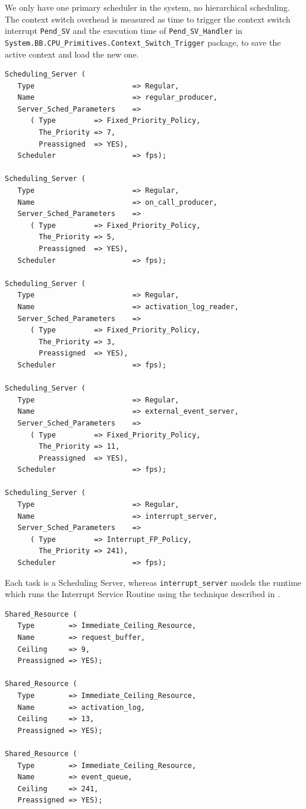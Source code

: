 \documentclass{article}
\begin{document}
We only have one primary scheduler in the system, no hierarchical scheduling. The context switch overhead is measured as time to trigger the context switch interrupt \texttt{Pend\_SV} and the execution time of \texttt{Pend\_SV\_Handler} in \texttt{System.BB.CPU\_Primitives.Context\_Switch\_Trigger} package, to save the active context and load the new one.

\begin{lstlisting}
Scheduling_Server (
   Type                       => Regular,
   Name                       => regular_producer,
   Server_Sched_Parameters    =>
      ( Type         => Fixed_Priority_Policy,
        The_Priority => 7,
        Preassigned  => YES),
   Scheduler                  => fps);

Scheduling_Server (
   Type                       => Regular,
   Name                       => on_call_producer,
   Server_Sched_Parameters    =>
      ( Type         => Fixed_Priority_Policy,
        The_Priority => 5,
        Preassigned  => YES),
   Scheduler                  => fps);

Scheduling_Server (
   Type                       => Regular,
   Name                       => activation_log_reader,
   Server_Sched_Parameters    =>
      ( Type         => Fixed_Priority_Policy,
        The_Priority => 3,
        Preassigned  => YES),
   Scheduler                  => fps);

Scheduling_Server (
   Type                       => Regular,
   Name                       => external_event_server,
   Server_Sched_Parameters    =>
      ( Type         => Fixed_Priority_Policy,
        The_Priority => 11,
        Preassigned  => YES),
   Scheduler                  => fps);

Scheduling_Server (
   Type                       => Regular,
   Name                       => interrupt_server,
   Server_Sched_Parameters    =>
      ( Type         => Interrupt_FP_Policy,
        The_Priority => 241),
   Scheduler                  => fps);
\end{lstlisting}

Each task is a Scheduling Server, whereas \texttt{interrupt\_server} models the runtime which runs the Interrupt Service Routine using the technique described in \cite{interrupt-handler}.

\begin{lstlisting}
Shared_Resource (
   Type        => Immediate_Ceiling_Resource,
   Name        => request_buffer,
   Ceiling     => 9,
   Preassigned => YES);

Shared_Resource (
   Type        => Immediate_Ceiling_Resource,
   Name        => activation_log,
   Ceiling     => 13,
   Preassigned => YES);

Shared_Resource (
   Type        => Immediate_Ceiling_Resource,
   Name        => event_queue,
   Ceiling     => 241,
   Preassigned => YES);
\end{lstlisting}
\end{document}
